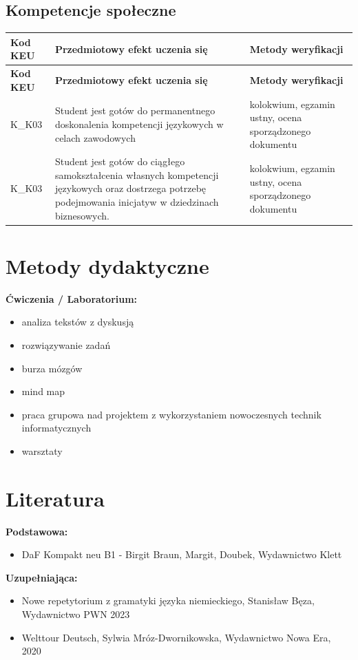 \documentclass[12pt, a4paper]{article}
\newcommand{\thdrule}{\noalign{\global\setlength{\extrarowheight}{0pt}}}
\newcommand{\thdend}{\noalign{\global\setlength{\extrarowheight}{3pt}}}
\begin{document}
\subsection*{Kompetencje społeczne}
{\scriptsize
\begin{longtable}{m{1.6cm}m{9.0cm}m{4.2cm}}
\thdrule\toprule
\rowcolor{pjatkRed} {\color{white}\footnotesize\textbf{\vphantom{Ag}Kod KEU}} & {\color{white}\footnotesize\textbf{\vphantom{Ag}Przedmiotowy efekt uczenia się}} & {\color{white}\footnotesize\textbf{\vphantom{Ag}Metody weryfikacji}} \\
\midrule\thdend
\endfirsthead
\thdrule\toprule
\rowcolor{pjatkRed} {\color{white}\footnotesize\textbf{\vphantom{Ag}Kod KEU}} & {\color{white}\footnotesize\textbf{\vphantom{Ag}Przedmiotowy efekt uczenia się}} & {\color{white}\footnotesize\textbf{\vphantom{Ag}Metody weryfikacji}} \\
\midrule\thdend
\endhead
  \rowcolor{tableRowLight} K\_K03 & Student jest gotów do permanentnego doskonalenia kompetencji językowych w celach zawodowych & kolokwium, egzamin ustny, ocena sporządzonego dokumentu \\
  \rowcolor{tableRowAlt} K\_K03 & Student jest gotów do ciągłego samokształcenia własnych kompetencji językowych oraz dostrzega potrzebę podejmowania inicjatyw w dziedzinach biznesowych. & kolokwium, egzamin ustny, ocena sporządzonego dokumentu \\
\bottomrule
\end{longtable}}

\section{Metody dydaktyczne}

\textbf{Ćwiczenia / Laboratorium:}
\begin{itemize}
  \item analiza tekstów z dyskusją
  \item rozwiązywanie zadań
  \item burza mózgów
  \item mind map
  \item praca grupowa nad projektem z wykorzystaniem nowoczesnych technik informatycznych
  \item warsztaty
\end{itemize}
\vspace{4pt}


\section{Literatura}

\textbf{Podstawowa:}
\begin{itemize}
  \item DaF Kompakt neu B1 - Birgit Braun, Margit, Doubek, Wydawnictwo Klett
\end{itemize}

\textbf{Uzupełniająca:}
\begin{itemize}
  \item Nowe repetytorium z gramatyki języka niemieckiego, Stanisław Bęza, Wydawnictwo PWN 2023
  \item Welttour Deutsch, Sylwia Mróz-Dwornikowska, Wydawnictwo Nowa Era, 2020
\end{itemize}
\end{document}
